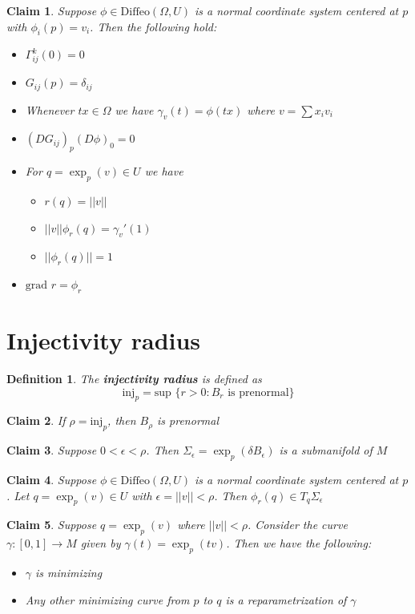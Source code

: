 \documentclass{article}
\newtheorem{definition}{Definition}
\newtheorem{claim}{Claim}
\begin{document}
\begin{claim}
  Suppose $\phi \in \text{Diffeo}(\Omega,U)$ is a normal coordinate system centered at $p$ with $\phi_i(p)=v_i$. Then the following hold:
  \begin{itemize}
    \item $\Gamma_{ij}^k(0)=0$
    \item $G_{ij}(p)=\delta_{ij}$
    \item Whenever $tx \in \Omega$ we have $\gamma_v(t)=\phi(tx)$ where $v=\sum x_iv_i$
    \item $(DG_{ij})_p(D\phi)_0=0$
    \item For $q =\exp_p(v) \in U$ we have 
      \begin{itemize}
        \item $r(q)=||v||$
        \item $||v||\phi_r(q)=\gamma_v'(1)$
        \item $||\phi_r(q)||=1$
      \end{itemize}
    \item $\text{grad }r=\phi_r$
  \end{itemize}
\end{claim}


\section{Injectivity radius}

\begin{definition}
  The \textbf{injectivity radius} is defined as \[\text{inj}_p=\text{sup }\{r > 0: B_r \text{ is prenormal}\}\]
\end{definition}

\begin{claim}
  If $\rho=\text{inj}_p$, then $B_\rho$ is prenormal
\end{claim}

\begin{claim}
  Suppose $0<\epsilon<\rho$. Then $\Sigma_\epsilon=\exp_p(\delta B_\epsilon)$ is a submanifold of $M$
\end{claim}

\begin{claim}
  Suppose $\phi \in \text{Diffeo}(\Omega,U)$ is a normal coordinate system centered at $p$. Let $q =\exp_p(v) \in U$ with $\epsilon= ||v||< \rho$. Then $\phi_r(q) \in T_q\Sigma_\epsilon$  
\end{claim}

\begin{claim}
  Suppose $q=\exp_p(v)$ where $||v||<\rho$. Consider the curve $\gamma:[0,1] \to M$ given by $\gamma(t)=\exp_p(tv)$. Then we have the following:
  \begin{itemize}
    \item $\gamma$ is minimizing
    \item Any other minimizing curve from $p$ to $q$ is a reparametrization of $\gamma$
  \end{itemize}
\end{claim}
\end{document}
